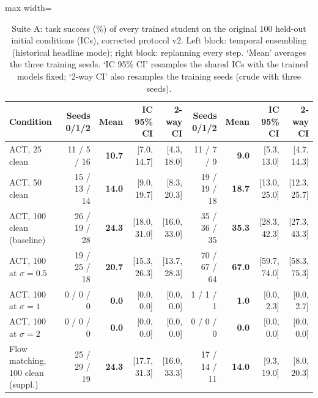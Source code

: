 \begin{table}[t]
\centering
\scriptsize
\begin{adjustbox}{max width=\linewidth}
\begin{tabular}{lrrrrrrrr}
\toprule
Condition & Seeds 0/1/2 & Mean & IC 95\% CI & 2-way CI & Seeds 0/1/2 & Mean & IC 95\% CI & 2-way CI \\
\midrule
ACT, 25 clean & 11 / 5 / 16 & \textbf{10.7} & [7.0, 14.7] & [4.3, 18.0] & 11 / 7 / 9 & \textbf{9.0} & [5.3, 13.0] & [4.7, 14.3] \\
ACT, 50 clean & 15 / 13 / 14 & \textbf{14.0} & [9.0, 19.7] & [8.3, 20.3] & 19 / 19 / 18 & \textbf{18.7} & [13.0, 25.0] & [12.3, 25.7] \\
ACT, 100 clean (baseline) & 26 / 19 / 28 & \textbf{24.3} & [18.0, 31.0] & [16.0, 33.0] & 35 / 36 / 35 & \textbf{35.3} & [28.3, 42.3] & [27.3, 43.3] \\
\midrule
ACT, 100 at $\sigma{=}0.5$ & 19 / 25 / 18 & \textbf{20.7} & [15.3, 26.3] & [13.7, 28.3] & 70 / 67 / 64 & \textbf{67.0} & [59.7, 74.0] & [58.3, 75.3] \\
ACT, 100 at $\sigma{=}1$ & 0 / 0 / 0 & \textbf{0.0} & [0.0, 0.0] & [0.0, 0.0] & 1 / 1 / 1 & \textbf{1.0} & [0.0, 2.3] & [0.0, 2.7] \\
ACT, 100 at $\sigma{=}2$ & 0 / 0 / 0 & \textbf{0.0} & [0.0, 0.0] & [0.0, 0.0] & 0 / 0 / 0 & \textbf{0.0} & [0.0, 0.0] & [0.0, 0.0] \\
\midrule
Flow matching, 100 clean (suppl.) & 25 / 29 / 19 & \textbf{24.3} & [17.7, 31.3] & [16.0, 33.3] & 17 / 14 / 11 & \textbf{14.0} & [9.3, 19.0] & [8.0, 20.3] \\
\bottomrule
\end{tabular}
\end{adjustbox}
\caption{Suite A: task success (\%) of every trained student on the original 100 held-out initial conditions (ICs), corrected protocol v2. Left block: temporal ensembling (historical headline mode); right block: replanning every step. `Mean' averages the three training seeds. `IC 95\% CI' resamples the shared ICs with the trained models fixed; `2-way CI' also resamples the training seeds (crude with three seeds).}
\label{tab:main}
\end{table}
